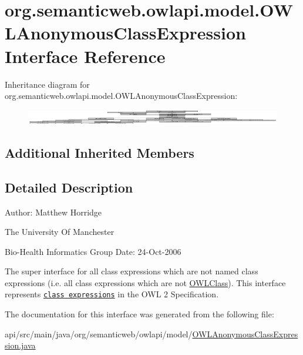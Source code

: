 \hypertarget{interfaceorg_1_1semanticweb_1_1owlapi_1_1model_1_1_o_w_l_anonymous_class_expression}{\section{org.\-semanticweb.\-owlapi.\-model.\-O\-W\-L\-Anonymous\-Class\-Expression Interface Reference}
\label{interfaceorg_1_1semanticweb_1_1owlapi_1_1model_1_1_o_w_l_anonymous_class_expression}
}
Inheritance diagram for org.\-semanticweb.\-owlapi.\-model.\-O\-W\-L\-Anonymous\-Class\-Expression\-:\begin{figure}[H]
\begin{center}
\leavevmode
\includegraphics[height=0.641221cm]{interfaceorg_1_1semanticweb_1_1owlapi_1_1model_1_1_o_w_l_anonymous_class_expression}
\end{center}
\end{figure}
\subsection*{Additional Inherited Members}


\subsection{Detailed Description}
Author\-: Matthew Horridge\par
 The University Of Manchester\par
 Bio-\/\-Health Informatics Group Date\-: 24-\/\-Oct-\/2006 

The super interface for all class expressions which are not named class expressions (i.\-e. all class expressions which are not {\ttfamily \hyperlink{interfaceorg_1_1semanticweb_1_1owlapi_1_1model_1_1_o_w_l_class}{O\-W\-L\-Class}}). This interface represents \href{http://www.w3.org/TR/2009/REC-owl2-syntax-20091027/#Class_Expressions}{\tt class expressions} in the O\-W\-L 2 Specification. 

The documentation for this interface was generated from the following file\-:\begin{DoxyCompactItemize}
\item 
api/src/main/java/org/semanticweb/owlapi/model/\hyperlink{_o_w_l_anonymous_class_expression_8java}{O\-W\-L\-Anonymous\-Class\-Expression.\-java}\end{DoxyCompactItemize}
